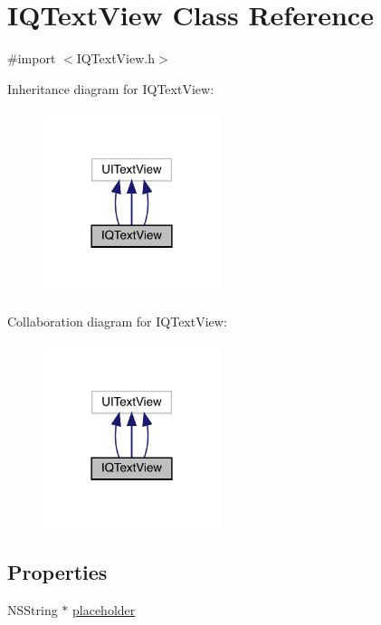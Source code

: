 \hypertarget{interface_i_q_text_view}{}\section{I\+Q\+Text\+View Class Reference}
\label{interface_i_q_text_view}


{\ttfamily \#import $<$I\+Q\+Text\+View.\+h$>$}



Inheritance diagram for I\+Q\+Text\+View\+:\nopagebreak
\begin{figure}[H]
\begin{center}
\leavevmode
\includegraphics[width=146pt]{interface_i_q_text_view__inherit__graph}
\end{center}
\end{figure}


Collaboration diagram for I\+Q\+Text\+View\+:\nopagebreak
\begin{figure}[H]
\begin{center}
\leavevmode
\includegraphics[width=146pt]{interface_i_q_text_view__coll__graph}
\end{center}
\end{figure}
\subsection*{Properties}
\begin{DoxyCompactItemize}
\item 
N\+S\+String $\ast$ \mbox{\hyperlink{interface_i_q_text_view_a5f79e06d8462c4be8e96954d349907db}{placeholder}}
\end{DoxyCompactItemize}


